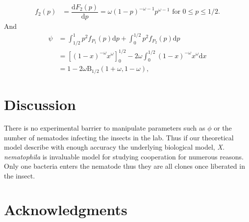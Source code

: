 \documentclass[10pt]{article}
\newcommand{\ud}{{\mathrm{d}}}
\newcommand{\Xnema}{\textit{X. nematophila} }
\begin{document}
\begin{boxframe}
\begin{multicols}{2}
\begin{align}
  f_2(p) &= \dfrac{ \ud F_2(p) }{ \ud p} =  \omega (1-p)^{-\omega-1} p^{\omega-1} \text{ for } 0 \leq p \leq 1/2.
  \end{align}
  And 
  \begin{align}
  \psi &= \int_{1/2}^{1} p^2 f_{P_1}(p) \ud p + \int_{0}^{1/2} p^2 f_{P_2}(p) \ud p \\
  &= [(1-x)^{-\omega} x^\omega]_{0}^{1/2} -2  \omega \int_{0}^{1/2}  (1-x)^{-\omega} x^{\omega}  \ud x \\
  &= 1- 2 \omega \mathrm{B}_{1/2}(1+\omega,1-\omega),
\end{align}
 \end{multicols}
\end{boxframe}
\begin{multicols}{2}

\section*{Discussion}

There is no experimental barrier to manipulate parameters such as $\phi$ or the number of nematodes infecting the insects in the lab. Thus if our theoretical model describe with enough accuracy the underlying biological model, \Xnema is invaluable model for studying cooperation for numerous reasons. 
Only one bacteria enters the nematode thus they are all clones once liberated in the insect. 


\section*{Acknowledgments}




\end{multicols}
\end{document}
